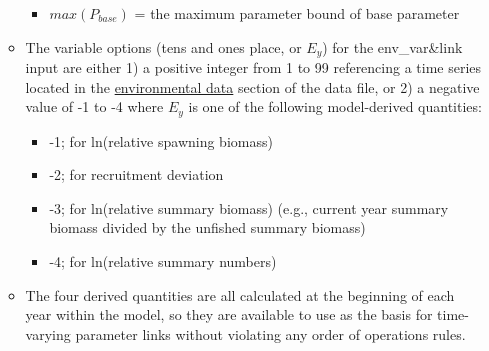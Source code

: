 \begin{itemize}
\begin{itemize}
\begin{itemize}
           \item $max(P_{base})$ = the maximum parameter bound of base parameter
        \end{itemize}
		\item The variable options (tens and ones place, or $E_{y}$) for the env\_var\&link input are either 1) a positive integer from 1 to 99 referencing a time series located in the \hyperlink{env-dat}{environmental data} section of the data file, or 2) a negative value of -1 to -4 where $E_y$ is one of the following model-derived quantities:
		\begin{itemize}
			\item -1;  for ln(relative spawning biomass)
			\item -2;  for recruitment deviation
			\item -3;  for ln(relative summary biomass) (e.g., current year summary biomass divided by the unfished summary biomass)
			\item -4;  for ln(relative summary numbers)
		\end{itemize}
		\item The four derived quantities are all calculated at the beginning of each year within the model, so they are available to use as the basis for time-varying parameter links without violating any order of operations rules.
	\end{itemize}
	

\end{itemize}
